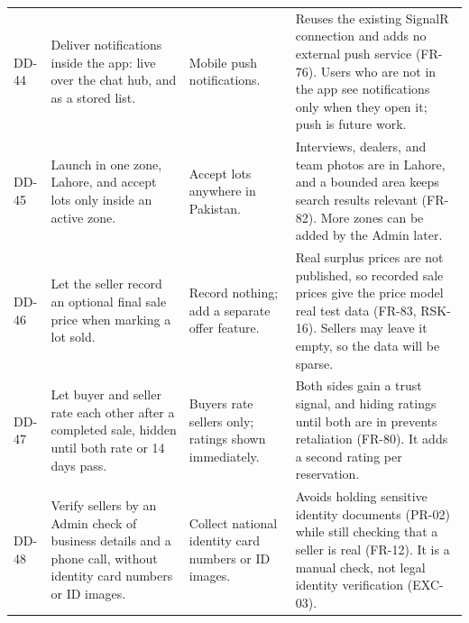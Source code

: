 {\begin{longtable}{@{}>{\raggedright\arraybackslash}p{}>{\raggedright\arraybackslash}p{}>{\raggedright\arraybackslash}p{}>{\raggedright\arraybackslash}p{}@{}}
DD-44 & Deliver notifications inside the app: live over the chat hub, and as a stored list. & Mobile push notifications. & Reuses the existing SignalR connection and adds no external push service (FR-76). Users who are not in the app see notifications only when they open it; push is future work. \\
DD-45 & Launch in one zone, Lahore, and accept lots only inside an active zone. & Accept lots anywhere in Pakistan. & Interviews, dealers, and team photos are in Lahore, and a bounded area keeps search results relevant (FR-82). More zones can be added by the Admin later. \\
DD-46 & Let the seller record an optional final sale price when marking a lot sold. & Record nothing; add a separate offer feature. & Real surplus prices are not published, so recorded sale prices give the price model real test data (FR-83, RSK-16). Sellers may leave it empty, so the data will be sparse. \\
DD-47 & Let buyer and seller rate each other after a completed sale, hidden until both rate or 14 days pass. & Buyers rate sellers only; ratings shown immediately. & Both sides gain a trust signal, and hiding ratings until both are in prevents retaliation (FR-80). It adds a second rating per reservation. \\
DD-48 & Verify sellers by an Admin check of business details and a phone call, without identity card numbers or ID images. & Collect national identity card numbers or ID images. & Avoids holding sensitive identity documents (PR-02) while still checking that a seller is real (FR-12). It is a manual check, not legal identity verification (EXC-03). \\
\bottomrule
\end{longtable}
}

